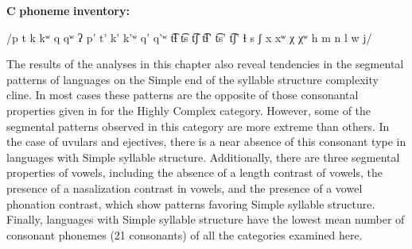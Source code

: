 \textbf{C} \textbf{phoneme} \textbf{inventory:} 

/p t k kʷ q qʷ ʔ p’ t’ k’ k’ʷ q’ q’ʷ t͡ɬ t͡s t͡ʃ t͡ɬ’ t͡s’ t͡ʃ’ ɬ s ʃ x xʷ χ χʷ h m n l w j/

\z

  The results of the analyses in this chapter also reveal tendencies in the segmental patterns of languages on the Simple end of the syllable structure complexity cline. In most cases these patterns are the opposite of those consonantal properties given in  for the Highly Complex category. However, some of the segmental patterns observed in this category are more extreme than others. In the case of uvulars and ejectives, there is a near absence of this consonant type in languages with Simple syllable structure. Additionally, there are three segmental properties of vowels, including the absence of a length contrast of vowels, the presence of a nasalization contrast in vowels, and the presence of a vowel phonation contrast, which show patterns favoring Simple syllable structure. Finally, languages with Simple syllable structure have the lowest mean number of consonant phonemes (21 consonants) of all the categories examined here.

